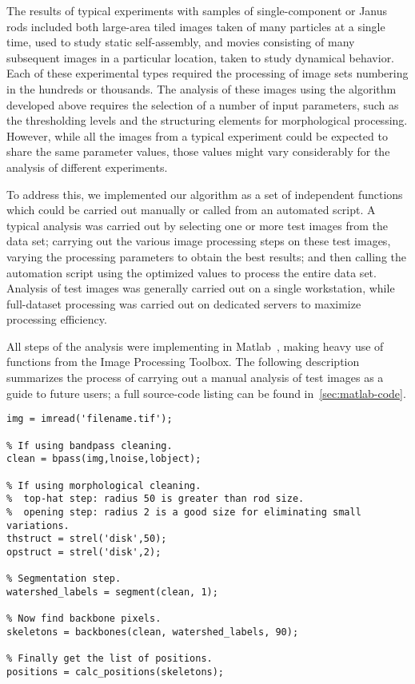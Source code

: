 The results of typical experiments with samples of single-component or Janus rods included both 
large-area tiled images taken of many particles at a single time,
used to study static self-assembly, and movies consisting of many subsequent images in a 
particular location, taken to study dynamical behavior.  Each of these experimental types required the processing
of image sets numbering in the hundreds or thousands.  The analysis of these images using the algorithm developed
above requires the selection of a number of input parameters, such as the thresholding levels and the 
structuring elements for morphological processing.  However, while all the images from a typical
experiment could be expected to share the same parameter values, those values might vary considerably for the 
analysis of different
experiments.

To address this, we implemented our algorithm as a set of independent functions which could be carried out manually 
or called from an automated script. A typical analysis was carried out by selecting one or more 
test images from the data set; carrying out the various image processing steps on these test images, varying
the processing parameters to obtain the best results; and then calling the automation script using the 
optimized values to process the entire data set.  Analysis of test images was generally carried out on a single
workstation, while full-dataset processing was carried out on dedicated servers to maximize processing efficiency.

All steps of the analysis were implementing in Matlab~\cite{matlab}, making heavy use of functions from the
Image Processing Toolbox.  The following description summarizes the process of carrying out a manual analysis of
test images as a guide to future users; a full source-code listing can be found in~\ref{sec:matlab-code}.

\pagebreak

\begin{lstlisting}[label=ls:manual,caption=Typical sequence of a manual analysis]
% Load the image.
img = imread('filename.tif');

% If using bandpass cleaning.
clean = bpass(img,lnoise,lobject);

% If using morphological cleaning.
%  top-hat step: radius 50 is greater than rod size.
%  opening step: radius 2 is a good size for eliminating small variations.
thstruct = strel('disk',50);
opstruct = strel('disk',2);

% Segmentation step.
watershed_labels = segment(clean, 1);

% Now find backbone pixels.
skeletons = backbones(clean, watershed_labels, 90);

% Finally get the list of positions.
positions = calc_positions(skeletons);
\end{lstlisting}

